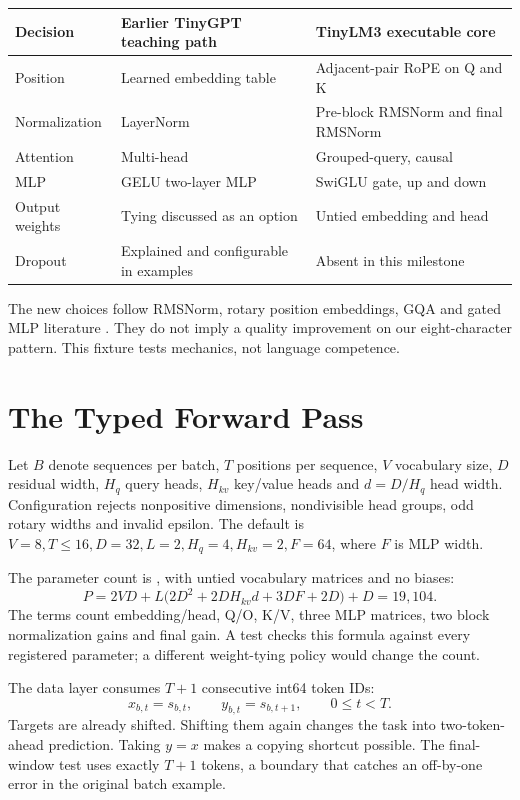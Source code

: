 \begin{center}
\begin{tabular}{lll}\toprule
Decision & Earlier TinyGPT teaching path & TinyLM3 executable core \\\midrule
Position & Learned embedding table & Adjacent-pair RoPE on Q and K \\
Normalization & LayerNorm & Pre-block RMSNorm and final RMSNorm \\
Attention & Multi-head & Grouped-query, causal \\
MLP & GELU two-layer MLP & SwiGLU gate, up and down \\
Output weights & Tying discussed as an option & Untied embedding and head \\
Dropout & Explained and configurable in examples & Absent in this milestone \\\bottomrule
\end{tabular}
\end{center}

The new choices follow RMSNorm, rotary position embeddings, GQA and gated MLP
literature \cite{zhang2019rmsnorm,su2021rope,ainslie2023gqa,shazeer2020glu}.
They do not imply a quality improvement on our eight-character pattern. This
fixture tests mechanics, not language competence.

\section{The Typed Forward Pass}

Let \(B\) denote sequences per batch, \(T\) positions per sequence, \(V\)
vocabulary size, \(D\) residual width, \(H_q\) query heads, \(H_{kv}\) key/value
heads and \(d=D/H_q\) head width. Configuration rejects nonpositive dimensions,
nondivisible head groups, odd rotary widths and invalid epsilon. The default
is \(V=8,T\leq16,D=32,L=2,H_q=4,H_{kv}=2,F=64\), where \(F\) is MLP width.

The parameter count is , with untied vocabulary matrices and no biases:
\[
 P=2VD+L\bigl(2D^2+2DH_{kv}d+3DF+2D\bigr)+D=19{,}104.
\]
The terms count embedding/head, Q/O, K/V, three MLP matrices, two block
normalization gains and final gain. A test checks this formula against every
registered parameter; a different weight-tying policy would change the count.

The data layer consumes \(T+1\) consecutive int64 token IDs:
\[
 x_{b,t}=s_{b,t},\qquad y_{b,t}=s_{b,t+1},\qquad 0\leq t<T.
\]
Targets are already shifted. Shifting them again changes the task into
two-token-ahead prediction. Taking \(y=x\) makes a copying shortcut possible.
The final-window test uses exactly \(T+1\) tokens, a boundary that catches an
off-by-one error in the original batch example.

